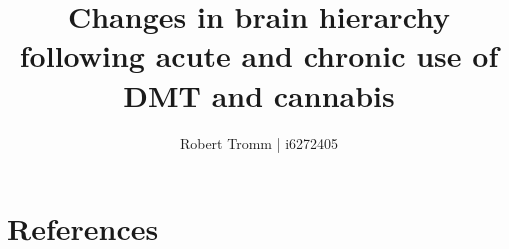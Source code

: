 \documentclass[12pt]{ociamthesis}  %
\title{Changes in brain hierarchy following acute and chronic use of DMT and cannabis}   %
\author{Robert Tromm | i6272405}             %
\begin{document}

\setcounter{secnumdepth}{3}
\setcounter{tocdepth}{3}


\maketitle                 %

\begin{romanpages}          %
\tableofcontents            %
\listoffigures              %
\end{romanpages}            %





%



\chapter{References}
\printbibliography[heading=none]

\appendix

\end{document}

